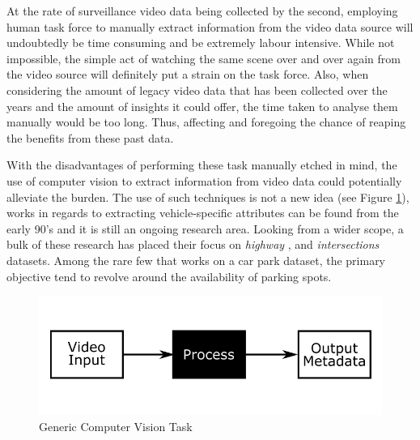 
At the rate of surveillance video data being collected by the second, employing human task force to manually extract information from the video data source will undoubtedly be time consuming and be extremely labour intensive. 
While not impossible, the simple act of watching the same scene over and over again from the video source will definitely put a strain on the task force. Also, when considering the amount of legacy video data that has been collected over the years and the amount of insights it could offer, the time taken to analyse them manually would be too long. Thus, affecting and foregoing the chance of reaping the benefits from these past data.
 
With the disadvantages of performing these task manually etched in mind, the use of computer vision to extract information from video data could potentially alleviate the burden. The use of such techniques is not a new idea (see Figure \ref{fig:genericCV}), works in regards to extracting vehicle-specific attributes can be found from the early 90's and it is still an ongoing research area. Looking from a wider scope, a bulk of these research has placed their focus on \textit{highway} \cite{yu2017improved, cao2016vehicle, arya2016real, liu2016highway, al2016adaptive}, and  \textit{intersections} \cite{meng2017traffic, choong2017modeling, ren2018learning} datasets. Among the rare few \cite{shi2017study, marmol2016quickspot, ling2017identifying} that works on a car park dataset, the primary objective tend to revolve around the availability of parking spots.

\begin{figure}[!hbt]\centering
\includegraphics[width=.8\textwidth]{image/general/simpleframe.png}
\caption{Generic Computer Vision Task}
\label{fig:genericCV}
\end{figure}

